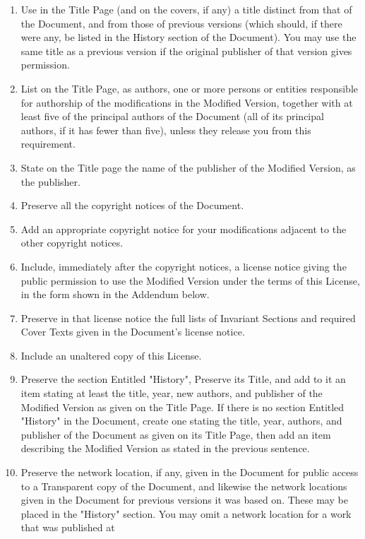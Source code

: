 \documentclass[11pt]{article}
\begin{document}
\begin{enumerate}
\item Use in the Title Page (and on the covers, if any) a title distinct
   from that of the Document, and from those of previous versions
   (which should, if there were any, be listed in the History section
   of the Document).  You may use the same title as a previous version
   if the original publisher of that version gives permission.
\item List on the Title Page, as authors, one or more persons or entities
   responsible for authorship of the modifications in the Modified
   Version, together with at least five of the principal authors of the
   Document (all of its principal authors, if it has fewer than five),
   unless they release you from this requirement.


\item State on the Title page the name of the publisher of the
   Modified Version, as the publisher.
\item Preserve all the copyright notices of the Document.
\item Add an appropriate copyright notice for your modifications
   adjacent to the other copyright notices.
\item Include, immediately after the copyright notices, a license notice
   giving the public permission to use the Modified Version under the
   terms of this License, in the form shown in the Addendum below.
\item Preserve in that license notice the full lists of Invariant Sections
   and required Cover Texts given in the Document's license notice.
\item Include an unaltered copy of this License.
\item Preserve the section Entitled "History", Preserve its Title, and add
   to it an item stating at least the title, year, new authors, and
   publisher of the Modified Version as given on the Title Page.  If
   there is no section Entitled "History" in the Document, create one
   stating the title, year, authors, and publisher of the Document as
   given on its Title Page, then add an item describing the Modified
   Version as stated in the previous sentence.
\item Preserve the network location, if any, given in the Document for
   public access to a Transparent copy of the Document, and likewise
   the network locations given in the Document for previous versions
   it was based on.  These may be placed in the "History" section.
   You may omit a network location for a work that was published at

\end{enumerate}
\end{document}
